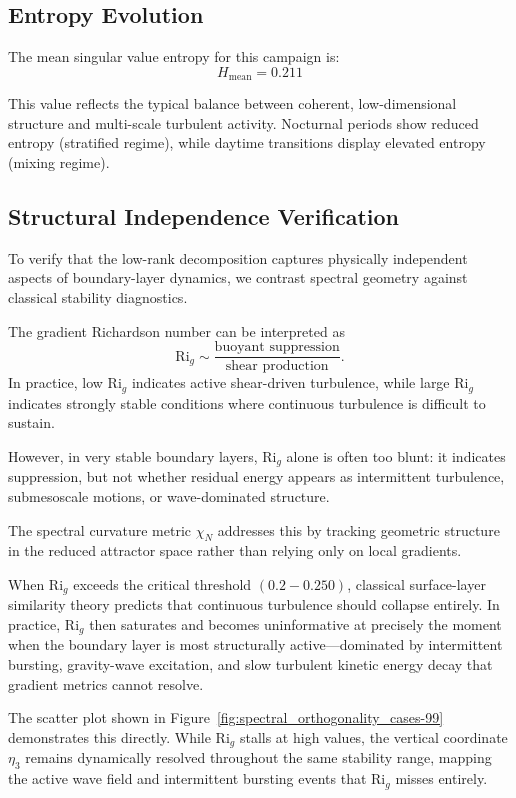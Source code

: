 \documentclass[11pt,a4paper]{article}
\begin{document}
\subsection{Entropy Evolution}

The mean singular value entropy for this campaign is:
\[
    H_{\text{mean}} = 0.211
\]

This value reflects the typical balance between coherent, low-dimensional structure and multi-scale turbulent activity. Nocturnal periods show reduced entropy (stratified regime), while daytime transitions display elevated entropy (mixing regime).

\subsection{Structural Independence Verification}

To verify that the low-rank decomposition captures physically independent aspects of boundary-layer dynamics, we contrast spectral geometry against classical stability diagnostics.

The gradient Richardson number can be interpreted as
\[
\mathrm{Ri}_g \sim \frac{\text{buoyant suppression}}{\text{shear production}}.
\]
In practice, low $\mathrm{Ri}_g$ indicates active shear-driven turbulence, while large $\mathrm{Ri}_g$ indicates strongly stable conditions where continuous turbulence is difficult to sustain.

However, in very stable boundary layers, $\mathrm{Ri}_g$ alone is often too blunt: it indicates suppression, but not whether residual energy appears as intermittent turbulence, submesoscale motions, or wave-dominated structure.

The spectral curvature metric $\chi_N$ addresses this by tracking geometric structure in the reduced attractor space rather than relying only on local gradients.

When $\mathrm{Ri}_g$ exceeds the critical threshold $(0.2-0.250)$, classical surface-layer similarity theory predicts that continuous turbulence should collapse entirely. In practice, $\mathrm{Ri}_g$ then saturates and becomes uninformative at precisely the moment when the boundary layer is most structurally active---dominated by intermittent bursting, gravity-wave excitation, and slow turbulent kinetic energy decay that gradient metrics cannot resolve.

The scatter plot shown in Figure~\ref{fig:spectral_orthogonality_cases-99} demonstrates this directly. While $\mathrm{Ri}_g$ stalls at high values, the vertical coordinate $\eta_3$ remains dynamically resolved throughout the same stability range, mapping the active wave field and intermittent bursting events that $\mathrm{Ri}_g$ misses entirely.
\end{document}
